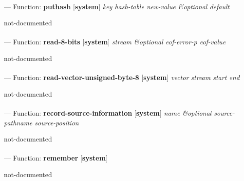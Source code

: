 \paragraph{}
\label{SYSTEM:PUTHASH}
--- Function: \textbf{puthash} [\textbf{system}] \textit{key hash-table new-value \&optional default}

\begin{adjustwidth}{5em}{5em}
not-documented
\end{adjustwidth}

\paragraph{}
\label{SYSTEM:READ-8-BITS}
--- Function: \textbf{read-8-bits} [\textbf{system}] \textit{stream \&optional eof-error-p eof-value}

\begin{adjustwidth}{5em}{5em}
not-documented
\end{adjustwidth}

\paragraph{}
\label{SYSTEM:READ-VECTOR-UNSIGNED-BYTE-8}
--- Function: \textbf{read-vector-unsigned-byte-8} [\textbf{system}] \textit{vector stream start end}

\begin{adjustwidth}{5em}{5em}
not-documented
\end{adjustwidth}

\paragraph{}
\label{SYSTEM:RECORD-SOURCE-INFORMATION}
--- Function: \textbf{record-source-information} [\textbf{system}] \textit{name \&optional source-pathname source-position}

\begin{adjustwidth}{5em}{5em}
not-documented
\end{adjustwidth}

\paragraph{}
\label{SYSTEM:REMEMBER}
--- Function: \textbf{remember} [\textbf{system}] \textit{}

\begin{adjustwidth}{5em}{5em}
not-documented
\end{adjustwidth}

